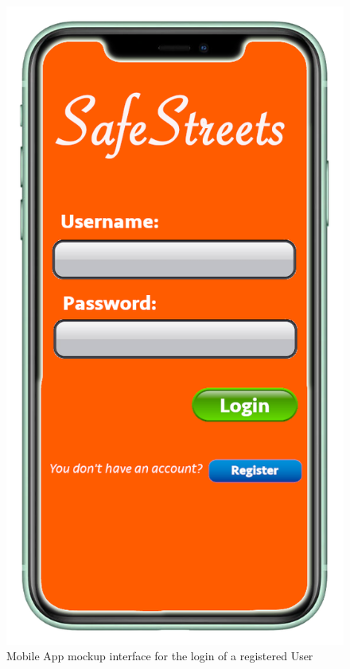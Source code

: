 \documentclass[a4paper]{report}
\begin{document}
{\begin{figure}
\begin{minipage}{.45\textwidth}
\includegraphics[width=.7\linewidth]{../RASD/img/mockups/loginscreen.png}
\caption[Mobile App mockup for the login screen]{Mobile App mockup interface for the login of a registered User}
\label{fig:login-page}
\end{minipage}\hfill
\begin{minipage}{.45\textwidth}
\centering

\end{minipage}
\end{figure}}
\end{document}
